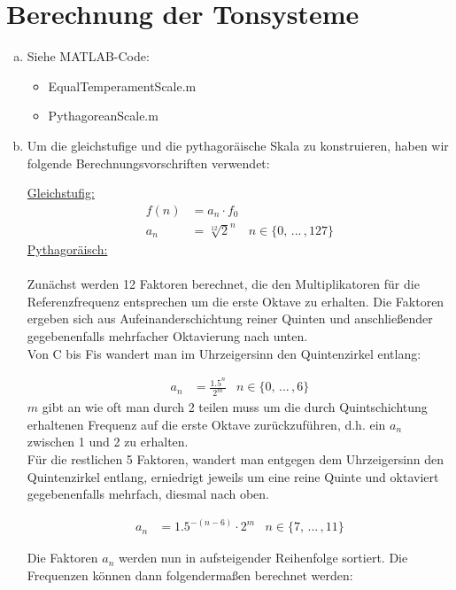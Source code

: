 \chapter{Berechnung der Tonsysteme}

\begin{enumerate}[a)]
\item
    Siehe MATLAB-Code:
    \begin{itemize}
    \item
    EqualTemperamentScale.m 
    \item
    PythagoreanScale.m
    \end{itemize}
\item
\label{sec:1b}
Um die gleichstufige und die pythagoräische Skala zu konstruieren, haben wir folgende Berechnungsvorschriften verwendet:

\underline{Gleichstufig:}
\begin{align*}
    f(n) &= a_n \cdot f_0 \\ 
    a_n &= \sqrt[12]{2}^n & n \in \{0, \,... \, ,127\}
\end{align*} 
\underline{Pythagoräisch:}
\\
\\
Zunächst werden 12 Faktoren berechnet, die den Multiplikatoren für die Referenzfrequenz entsprechen um die erste Oktave zu erhalten.
Die Faktoren ergeben sich aus Aufeinanderschichtung reiner Quinten und anschließender gegebenenfalls mehrfacher Oktavierung nach unten.
\\
Von C bis Fis wandert man im Uhrzeigersinn den Quintenzirkel entlang:

\begin{align*}
    a_n &= \frac{1.5^n}{2^m} & n \in \{0,  \,... \, ,6\}
\end{align*} 
$m$ gibt an wie oft man durch 2 teilen muss um die durch Quintschichtung erhaltenen Frequenz auf die erste Oktave zurückzuführen, d.h. ein $a_n$ zwischen 1 und 2 zu erhalten.
\\

Für die restlichen 5 Faktoren, wandert man entgegen dem Uhrzeigersinn den Quintenzirkel entlang, erniedrigt jeweils um eine reine Quinte und oktaviert gegebenenfalls mehrfach, diesmal nach oben.

\begin{align*}
    a_n &= 1.5^{-(n-6)} \cdot 2^m & n \in \{ 7, \, ... \, ,11 \}
\end{align*}

Die Faktoren $a_n$ werden nun in aufsteigender Reihenfolge sortiert. Die Frequenzen können dann folgendermaßen berechnet werden:


\end{enumerate}
